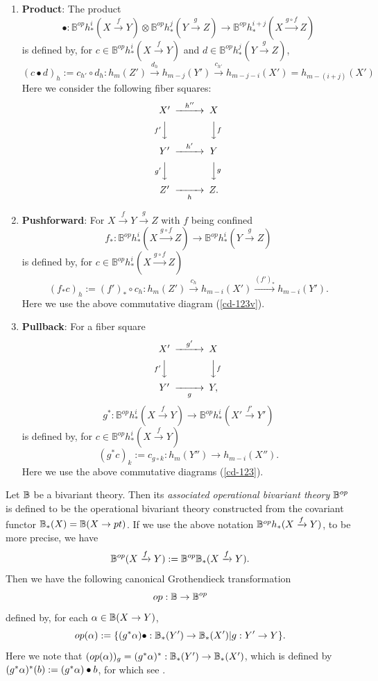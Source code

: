 \documentclass[a4paper]{amsart}
\begin{document}
\begin{defn}\label{defn-op-biv}
\begin{enumerate}
\item {\bf Product}: The product
$$\bullet: \mathbb B^{op}h_*^i(X \xrightarrow f Y) \otimes \mathbb B^{op}h_*^j(Y \xrightarrow g Z) \to \mathbb B^{op}h_*^{i+j}(X \xrightarrow {g \circ f} Z)$$
is defined by, for $c \in \mathbb B^{op}h_*^i(X \xrightarrow f Y) $ and $d \in \mathbb B^{op}h_*^j(Y \xrightarrow g Z) $,
$$(c \bullet d)_h:= c_{h'} \circ d_h: h_m(Z') \xrightarrow {d_h}  h_{m-j}(Y') \xrightarrow {c_{h'}} h_{m-j-i}(X')=h_{m-(i+j)}(X')$$
Here we consider the following fiber squares:
\begin{equation}\label{cd-123v}
\CD
X' @> {h''} >> X \\
@V {f'}VV @VV {f}V\\
Y' @> {h'} >> Y \\
@V {g'}VV @VV {g}V \\
Z'  @>> {h} > Z. \endCD 
\end{equation}
\item {\bf Pushforward}: For $X \xrightarrow f Y \xrightarrow g Z$ with $f$ being confined 
$$f_*: \mathbb B^{op}h_*^i(X \xrightarrow {g \circ f} Z) \to \mathbb B^{op}h_*^i(Y \xrightarrow g Z)$$
is defined by, for $c \in \mathbb B^{op}h_*^i(X \xrightarrow {g \circ f} Z)$ 
$$(f_*c)_h := (f')_* \circ c_h: h_m(Z') \xrightarrow{c_h} h_{m-i}(X')  \xrightarrow{(f')_*} h_{m-i}(Y').$$
Here we use the above commutative diagram (\ref{cd-123v}).
\item {\bf Pullback}: For a fiber square 
$$\CD
X' @> {g'}  >> X\\
@V {f'} VV @VV fV\\
Y' @>> {g} > Y,\\
\endCD
$$
$$g^*: \mathbb B^{op}h_*^i(X \xrightarrow f Y ) \to \mathbb B^{op}h_*^i(X' \xrightarrow {f'} Y' )$$
is defined by, for $c \in \mathbb B^{op}h_*^i(X \xrightarrow f Y) $
$$(g^*c)_k := c_{g \circ k}: h_m(Y'') \to h_{m-i}(X'').$$
Here we use the above commutative diagrams (\ref{cd-123}).
\end{enumerate}
\end{defn}

Let $\mathbb B$ be a bivariant theory. Then its \emph{associated operational bivariant theory} $\mathbb B^{op}$ is defined to be the operational bivariant theory constructed from the covariant functor $\mathbb B_*(X) = \mathbb B(X \to pt)$. If we use the above notation $\mathbb B^{op}h_*(X \xrightarrow f Y)$, to be more precise, we have
$$\mathbb B^{op}(X \xrightarrow f Y):= \mathbb B^{op}\mathbb B_*(X \xrightarrow f Y).$$
Then we have the following canonical Grothendieck transformation
$$ op:\mathbb B \to \mathbb B^{op}$$
defined by, for each $\alpha \in \mathbb B(X \to Y)$,
$$
op(\alpha):= \{ (g^*\alpha) \bullet : \mathbb B_*(Y') \to \mathbb B_*(X') | g:Y' \to Y \}.
$$
Here we note that $(op(\alpha))_g = (g^*\alpha)^*:\mathbb B_*(Y') \to \mathbb B_*(X')$, which is defined by 
$(g^*\alpha)^*(b):= (g^*\alpha) \bullet b$,
for which see \cite[\S 2.5 Gysin homomorphisms]{FM}.
\end{document}
